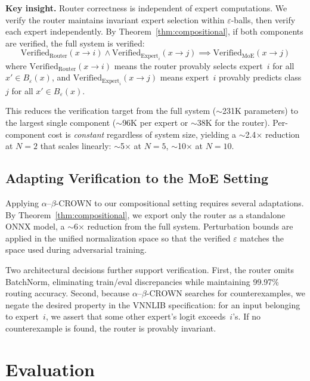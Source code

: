 \documentclass[runningheads]{llncs}
\begin{document}
\textbf{Key insight.} Router correctness is independent of expert computations. We verify the router maintains invariant expert selection within $\varepsilon$-balls, then verify each expert independently. By Theorem~\ref{thm:compositional}, if both components are verified, the full system is verified:
\begin{equation}
\text{Verified}_{\text{Router}}(x \to i) \land \text{Verified}_{\text{Expert}_i}(x \to j) \implies \text{Verified}_{\text{MoE}}(x \to j)
\end{equation}
where $\text{Verified}_{\text{Router}}(x \to i)$ means the router provably selects expert~$i$ for all $x' \in B_\varepsilon(x)$, and $\text{Verified}_{\text{Expert}_i}(x \to j)$ means expert~$i$ provably predicts class~$j$ for all $x' \in B_\varepsilon(x)$.

This reduces the verification target from the full system (${\sim}$231K parameters) to the largest single component (${\sim}$96K per expert or ${\sim}$38K for the router). Per-component cost is \emph{constant} regardless of system size, yielding a ${\sim}$2.4$\times$ reduction at $N{=}2$ that scales linearly: ${\sim}$5$\times$ at $N{=}5$, ${\sim}$10$\times$ at $N{=}10$.

\subsection{Adapting Verification to the MoE Setting}

Applying $\alpha$--$\beta$-CROWN to our compositional setting requires several adaptations. By Theorem~\ref{thm:compositional}, we export only the router as a standalone ONNX model, a ${\sim}$6$\times$ reduction from the full system. Perturbation bounds are applied in the unified normalization space so that the verified $\varepsilon$ matches the space used during adversarial training.

Two architectural decisions further support verification. First, the router omits BatchNorm, eliminating train/eval discrepancies while maintaining 99.97\% routing accuracy. Second, because $\alpha$--$\beta$-CROWN searches for counterexamples, we negate the desired property in the VNNLIB specification: for an input belonging to expert~$i$, we assert that some other expert's logit exceeds~$i$'s. If no counterexample is found, the router is provably invariant.

\section{Evaluation}
\end{document}
